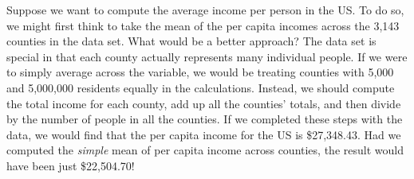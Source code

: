 
\begin{examplewrap}
\begin{nexample}{Suppose we want to compute the average income
    per person in the US. To do so, we might first think to take
    the mean of the per capita incomes across the 3,143 counties
    in the  data set. What would be a better approach?}
    \label{wtdMeanOfIncome}
  The  data set is special in that each county
  actually represents many individual people.
  If we were to simply average across the 
  variable, we would be treating counties with 5,000 and
  5,000,000 residents equally in the calculations.
  Instead, we should compute the total income for each county,
  add up all the counties' totals, and then divide by the number
  of people in all the counties.
  If we completed these steps with the  data,
  we would find that the per capita income for the US is
  \$27,348.43.
  Had we computed the \emph{simple} mean of per capita income
  across counties, the result would have been just \$22,504.70!
\end{nexample}
\end{examplewrap}

